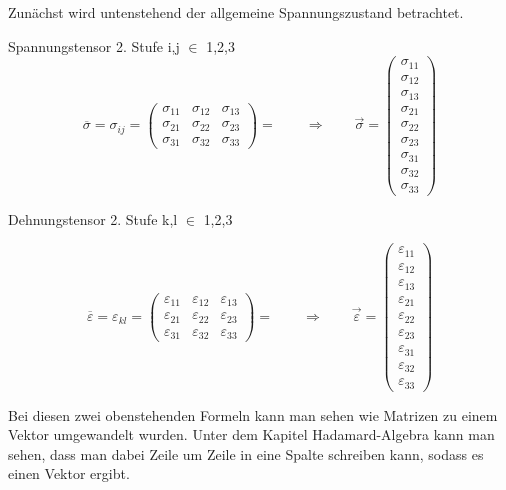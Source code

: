 Zunächst wird untenstehend der allgemeine Spannungszustand betrachtet.

Spannungstensor 2. Stufe i,j $\in$ {1,2,3}
\[
\overline{\sigma}
=
\sigma_{ij}
=
\begin{pmatrix}
	\sigma_{11} & \sigma_{12} & \sigma_{13} \\ 
	\sigma_{21} & \sigma_{22} & \sigma_{23} \\
	\sigma_{31} & \sigma_{32} & \sigma_{33}
\end{pmatrix}
=
\qquad
\Rightarrow
\qquad
\vec{\sigma}
=
\begin{pmatrix}
	\sigma_{11}\\
	\sigma_{12}\\
	\sigma_{13}\\
	\sigma_{21}\\
	\sigma_{22}\\
	\sigma_{23}\\
	\sigma_{31}\\
	\sigma_{32}\\
	\sigma_{33}
\end{pmatrix}
\]

Dehnungstensor 2. Stufe k,l $\in$ {1,2,3}

\[
\overline{\varepsilon}
=
\varepsilon_{kl}
=
\begin{pmatrix}
	\varepsilon_{11} & \varepsilon_{12} & \varepsilon_{13} \\ 
	\varepsilon_{21} & \varepsilon_{22} & \varepsilon_{23} \\
	\varepsilon_{31} & \varepsilon_{32} & \varepsilon_{33}
\end{pmatrix}
=
\qquad
\Rightarrow
\qquad
\vec{\varepsilon}
=
\begin{pmatrix}
	\varepsilon_{11} \\
	\varepsilon_{12} \\
	\varepsilon_{13} \\
	\varepsilon_{21} \\
	\varepsilon_{22} \\
	\varepsilon_{23} \\
	\varepsilon_{31} \\
	\varepsilon_{32} \\
	\varepsilon_{33}
\end{pmatrix}
\]

Bei diesen zwei obenstehenden Formeln kann man sehen wie Matrizen zu einem Vektor umgewandelt wurden.
Unter dem Kapitel Hadamard-Algebra kann man sehen, dass man dabei Zeile um Zeile in eine Spalte schreiben kann,
sodass es einen Vektor ergibt.

